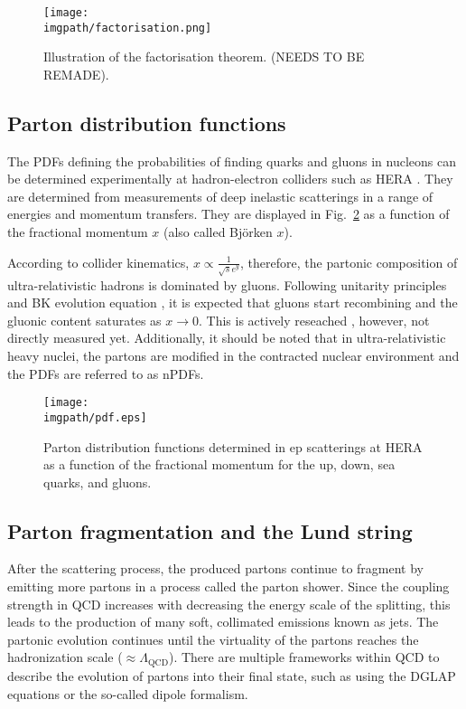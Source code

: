 \begin{figure}[H]
\texttt{[image: \\imgpath/factorisation.png]}
\caption{Illustration of the factorisation theorem. (NEEDS TO BE REMADE).}
\label{fig:intro:factorisation}
\end{figure}

\subsection{Parton distribution functions}

The PDFs defining the probabilities of finding quarks and gluons in nucleons can be determined experimentally at hadron-electron colliders such as HERA \cite{cooper-sarkarExtractionProtonParton2008}. They are determined from measurements of deep inelastic scatterings in a range of energies and momentum transfers. They are displayed in Fig.~\ref{fig:intro:pdfs} as a function of the fractional momentum $x$ (also called Bj\"orken $x$). 

According to collider kinematics, $x \propto \frac{1}{\sqrt{s}e^y}$, therefore, the partonic composition of ultra-relativistic hadrons is dominated by gluons. Following unitarity principles and BK evolution equation \cite{marquetBalitskyKovchegovEquationFull2005}, it is expected that gluons start recombining and the gluonic content saturates as $x\rightarrow0$. This is actively reseached \cite{starcollaborationEvidenceNonlinearGluon2022}, however, not directly measured yet. Additionally, it should be noted that in ultra-relativistic heavy nuclei, the partons are modified in the contracted nuclear environment and the PDFs are referred to as nPDFs.

\begin{figure}[H]
\texttt{[image: \\imgpath/pdf.eps]}
\caption{Parton distribution functions determined in ep scatterings at HERA as a function of the fractional momentum for the up, down, sea quarks, and gluons. \cite{cooper-sarkarExtractionProtonParton2008}}
\label{fig:intro:pdfs}
\end{figure}

\subsection{Parton fragmentation and the Lund string}

After the scattering process, the produced partons continue to fragment by emitting more partons in a process called the parton shower. Since the coupling strength in QCD increases with decreasing the energy scale of the splitting, this leads to the production of many soft, collimated emissions known as jets. The partonic evolution continues until the virtuality of the partons reaches the hadronization scale ($\approx \Lambda_\mathrm{QCD}$). There are multiple frameworks within QCD to describe the evolution of partons into their final state, such as using the DGLAP equations or the so-called dipole formalism.

